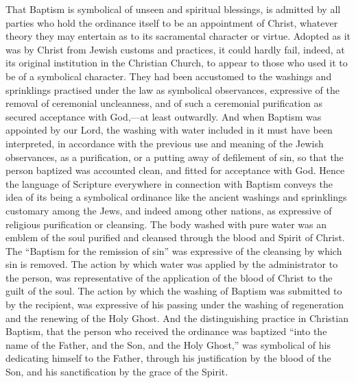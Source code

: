 \documentclass[]{book}
\begin{document}
That Baptism is symbolical of unseen and spiritual blessings, is admitted by all parties who hold the ordinance itself to be an appointment of Christ, whatever theory they may entertain as to its sacramental character or virtue. Adopted as it was by Christ from Jewish customs and practices, it could hardly fail, indeed, at its original institution in the Christian Church, to appear to those who used it to be of a symbolical character. They had been accustomed to the washings and sprinklings practised under the law as symbolical observances, expressive of the removal of ceremonial uncleanness, and of such a ceremonial purification as secured acceptance with God,---at least outwardly. And when Baptism was appointed by our Lord, the washing with water included in it must have been interpreted, in accordance with the previous use and meaning of the Jewish observances, as a purification, or a putting away of defilement of sin, so that the person baptized was accounted clean, and fitted for acceptance with God. Hence the language of Scripture everywhere in connection with Baptism conveys the idea of its being a symbolical ordinance like the ancient washings and sprinklings customary among the Jews, and indeed among other nations, as expressive of religious purification or cleansing. The body washed with pure water was an emblem of the soul purified and cleansed through the blood and Spirit of Christ. The ``Baptism for the remission of sin'' was expressive of the cleansing by which sin is removed. The action by which water was applied by the administrator to the person, was representative of the application of the blood of Christ to the guilt of the soul. The action by which the washing of Baptism was submitted to by the recipient, was expressive of his passing under the washing of regeneration and the renewing of the Holy Ghost. And the distinguishing practice in Christian Baptism, that the person who received the ordinance was baptized ``into the name of the Father, and the Son, and the Holy Ghost,'' was symbolical of his dedicating himself to the Father, through his justification by the blood of the Son, and his sanctification by the grace of the Spirit.
\end{document}
